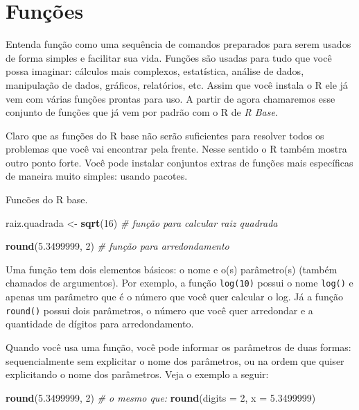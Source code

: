 \documentclass[]{book}
\newenvironment{Shaded}{\begin{snugshade}}{\end{snugshade}}
\newcommand{\KeywordTok}[1]{\textcolor[rgb]{0.13,0.29,0.53}{\textbf{#1}}}
\newcommand{\DataTypeTok}[1]{\textcolor[rgb]{0.13,0.29,0.53}{#1}}
\newcommand{\DecValTok}[1]{\textcolor[rgb]{0.00,0.00,0.81}{#1}}
\newcommand{\FloatTok}[1]{\textcolor[rgb]{0.00,0.00,0.81}{#1}}
\newcommand{\StringTok}[1]{\textcolor[rgb]{0.31,0.60,0.02}{#1}}
\newcommand{\CommentTok}[1]{\textcolor[rgb]{0.56,0.35,0.01}{\textit{#1}}}
\newcommand{\NormalTok}[1]{#1}
\begin{document}
\section{Funções}\label{funcoes}

Entenda função como uma sequência de comandos preparados para serem
usados de forma simples e facilitar sua vida. Funções são usadas para
tudo que você possa imaginar: cálculos mais complexos, estatística,
análise de dados, manipulação de dados, gráficos, relatórios, etc. Assim
que você instala o R ele já vem com várias funções prontas para uso. A
partir de agora chamaremos esse conjunto de funções que já vem por
padrão com o R de \emph{R Base}.

Claro que as funções do R base não serão suficientes para resolver todos
os problemas que você vai encontrar pela frente. Nesse sentido o R
também mostra outro ponto forte. Você pode instalar conjuntos extras de
funções mais específicas de maneira muito simples: usando pacotes.

Funcões do R base.

\begin{Shaded}
\begin{Highlighting}[]
\NormalTok{raiz.quadrada <-}\StringTok{ }\KeywordTok{sqrt}\NormalTok{(}\DecValTok{16}\NormalTok{) }\CommentTok{# função para calcular raiz quadrada}

\KeywordTok{round}\NormalTok{(}\FloatTok{5.3499999}\NormalTok{, }\DecValTok{2}\NormalTok{) }\CommentTok{# função para arredondamento}
\end{Highlighting}
\end{Shaded}

Uma função tem dois elementos básicos: o nome e o(s) parâmetro(s)
(também chamados de argumentos). Por exemplo, a função \texttt{log(10)}
possui o nome \texttt{log()} e apenas um parâmetro que é o número que
você quer calcular o log. Já a função \texttt{round()} possui dois
parâmetros, o número que você quer arredondar e a quantidade de dígitos
para arredondamento.

Quando você usa uma função, você pode informar os parâmetros de duas
formas: sequencialmente sem explicitar o nome dos parâmetros, ou na
ordem que quiser explicitando o nome dos parâmetros. Veja o exemplo a
seguir:

\begin{Shaded}
\begin{Highlighting}[]
\KeywordTok{round}\NormalTok{(}\FloatTok{5.3499999}\NormalTok{, }\DecValTok{2}\NormalTok{)}
\CommentTok{# o mesmo que:}
\KeywordTok{round}\NormalTok{(}\DataTypeTok{digits =} \DecValTok{2}\NormalTok{, }\DataTypeTok{x =} \FloatTok{5.3499999}\NormalTok{)}
\end{Highlighting}
\end{Shaded}
\end{document}
